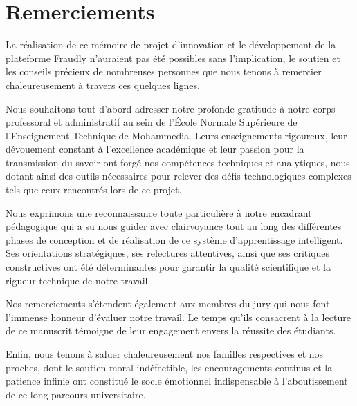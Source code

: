 \chapter*{Remerciements}

La réalisation de ce mémoire de projet d'innovation et le développement de la plateforme Fraudly n'auraient pas été possibles sans l'implication, le soutien et les conseils précieux de nombreuses personnes que nous tenons à remercier chaleureusement à travers ces quelques lignes. 

Nous souhaitons tout d'abord adresser notre profonde gratitude à notre corps professoral et administratif au sein de l'École Normale Supérieure de l'Enseignement Technique de Mohammedia. Leurs enseignements rigoureux, leur dévouement constant à l'excellence académique et leur passion pour la transmission du savoir ont forgé nos compétences techniques et analytiques, nous dotant ainsi des outils nécessaires pour relever des défis technologiques complexes tels que ceux rencontrés lors de ce projet.

Nous exprimons une reconnaissance toute particulière à notre encadrant pédagogique qui a su nous guider avec clairvoyance tout au long des différentes phases de conception et de réalisation de ce système d'apprentissage intelligent. Ses orientations stratégiques, ses relectures attentives, ainsi que ses critiques constructives ont été déterminantes pour garantir la qualité scientifique et la rigueur technique de notre travail.

Nos remerciements s'étendent également aux membres du jury qui nous font l'immense honneur d'évaluer notre travail. Le temps qu'ils consacrent à la lecture de ce manuscrit témoigne de leur engagement envers la réussite des étudiants. 

Enfin, nous tenons à saluer chaleureusement nos familles respectives et nos proches, dont le soutien moral indéfectible, les encouragements continus et la patience infinie ont constitué le socle émotionnel indispensable à l'aboutissement de ce long parcours universitaire.
